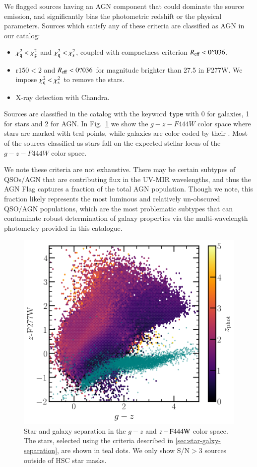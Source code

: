 \documentclass[longauth]{aa}
\begin{document}
We flagged sources having an AGN component that could dominate the source emission, and significantly bias the photometric redshift or the physical parameters. Sources which satisfy any of these criteria are classified as AGN in our catalog:
\begin{itemize}
    \item $\chi^2_{\rm{q}}<\chi^2_{\rm{g}}$ and $\chi^2_{\rm{q}}<\chi^2_{\rm{s}}$, coupled with compactness criterion $R_{\rm{eff}}<0{\overset{\prime\prime}{.}}036$.
    \item r$150<2$ and $R_{\rm{eff}}<0{\overset{\prime\prime}{.}}036$ for magnitude brighter than 27.5 in F277W. We impose $\chi^2_{\rm{q}}<\chi^2_{\rm{s}}$ to remove the stars.
    \item X-ray detection with Chandra.
\end{itemize}

Sources are classified in the catalog with the keyword \texttt{type} with 0 for galaxies, 1 for stars and 2 for AGN. In Fig.~\ref{fig:star-gal-separation} we show the $g-z-F444W$ color space where stars are marked with teal points, while galaxies are color coded by their \zphot. Most of the sources classified as stars fall on the expected stellar locus of the $g-z-F444W$ color space.

We note these criteria are not exhaustive. There may be certain subtypes of QSOs/AGN that are contributing flux in the UV-MIR wavelengths, and thus the AGN Flag captures a fraction of the total AGN population. Though we note, this fraction likely represents the most luminous and relatively un-obscured QSO/AGN populations, which are the most problematic subtypes that can contaminate robust determination of galaxy properties via the multi-wavelength photometry provided in this catalogue.

\begin{figure}[h!]
\includegraphics[width=1\columnwidth]{figures/star-separation.png}
\caption{Star and galaxy separation in the $g-z$ and $z-{\rm F444W}$ color space. The stars, selected using the criteria described in \ref{sec:star-galxy-separation}, are shown in teal dots. We only show S/N$>3$ sources outside of HSC star masks.
}
\label{fig:star-gal-separation}
\end{figure}
\end{document}
